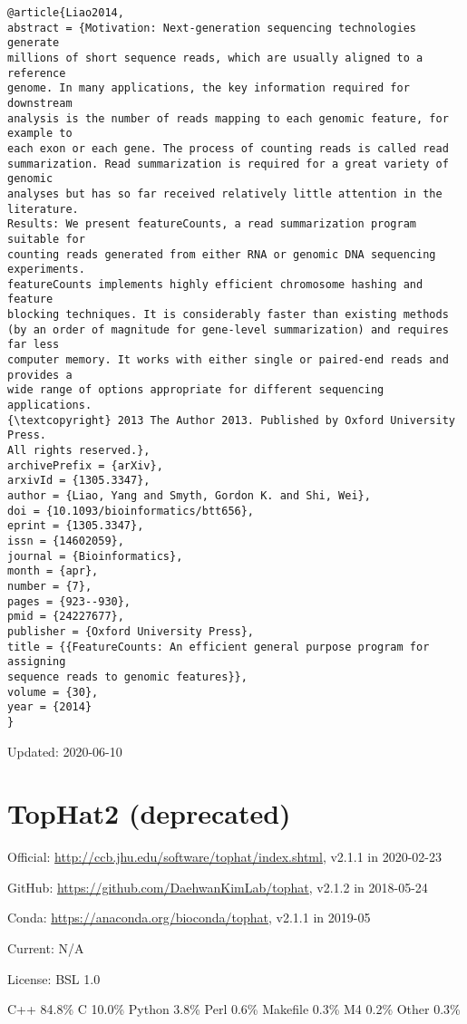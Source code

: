 \documentclass[]{article}
\begin{document}
\begin{verbatim}
@article{Liao2014,
abstract = {Motivation: Next-generation sequencing technologies generate
millions of short sequence reads, which are usually aligned to a reference
genome. In many applications, the key information required for downstream
analysis is the number of reads mapping to each genomic feature, for example to
each exon or each gene. The process of counting reads is called read
summarization. Read summarization is required for a great variety of genomic
analyses but has so far received relatively little attention in the literature.
Results: We present featureCounts, a read summarization program suitable for
counting reads generated from either RNA or genomic DNA sequencing experiments.
featureCounts implements highly efficient chromosome hashing and feature
blocking techniques. It is considerably faster than existing methods
(by an order of magnitude for gene-level summarization) and requires far less
computer memory. It works with either single or paired-end reads and provides a
wide range of options appropriate for different sequencing applications.
{\textcopyright} 2013 The Author 2013. Published by Oxford University Press.
All rights reserved.},
archivePrefix = {arXiv},
arxivId = {1305.3347},
author = {Liao, Yang and Smyth, Gordon K. and Shi, Wei},
doi = {10.1093/bioinformatics/btt656},
eprint = {1305.3347},
issn = {14602059},
journal = {Bioinformatics},
month = {apr},
number = {7},
pages = {923--930},
pmid = {24227677},
publisher = {Oxford University Press},
title = {{FeatureCounts: An efficient general purpose program for assigning
sequence reads to genomic features}},
volume = {30},
year = {2014}
}
\end{verbatim}

Updated: 2020-06-10

\section{TopHat2 (deprecated)}

Official: \url{http://ccb.jhu.edu/software/tophat/index.shtml}, v2.1.1 in 2020-02-23

GitHub: \url{https://github.com/DaehwanKimLab/tophat}, v2.1.2 in 2018-05-24

Conda: \url{https://anaconda.org/bioconda/tophat}, v2.1.1 in 2019-05

Current: N/A

License: BSL 1.0

C++ 84.8\% C 10.0\% Python 3.8\% Perl 0.6\% Makefile 0.3\% M4 0.2\% Other 0.3\%
\end{document}
